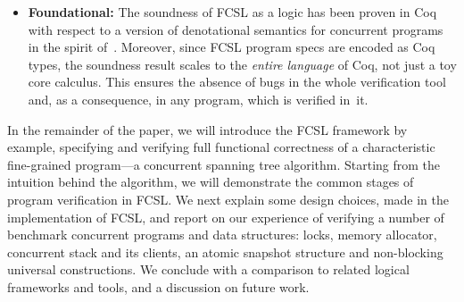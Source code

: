 \begin{itemize}[leftmargin=*]
\item \textbf{Foundational:} The soundness of FCSL as a logic has been
  proven in Coq with respect to a version of denotational semantics
  for concurrent programs in the spirit
  of~\citet{Brookes:TCS07}. Moreover, since FCSL program specs are
  encoded as Coq types, the soundness result scales to the
  \emph{entire language} of Coq, not just a toy core calculus. This
  ensures the absence of bugs in the whole verification tool and, as a
  consequence, in any program, which is verified in~it.

\end{itemize}

\noindent
In the remainder of the paper, we will introduce the FCSL framework by
example, specifying and verifying full functional correctness of a
characteristic fine-grained program---a concurrent spanning tree
algorithm.
%
Starting from the intuition behind the algorithm, we will demonstrate
the common stages of program verification in FCSL.
%
%
We next explain some design choices, made in the implementation
of FCSL, and report on our experience of verifying a number of
benchmark concurrent programs and data structures: locks, memory
allocator, concurrent stack and its clients, an atomic snapshot
structure and non-blocking universal constructions.
%
We conclude with a comparison to related logical frameworks
and tools, and a discussion on future work.
